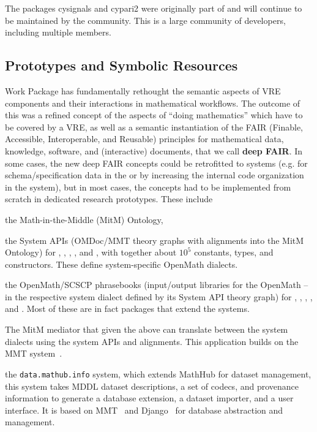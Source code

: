 \documentclass{deliverablereport}
\def\dmh{\texttt{data.mathub.info}\xspace}
\begin{document}
The packages cysignals and cypari2 were originally part of \Sage
and will continue to be maintained by the \Sage community.
This is a large community of developers, including multiple \ODK members.

  \subsection{Prototypes and Symbolic Resources}

Work Package  has fundamentally rethought the semantic aspects of VRE components and their interactions in mathematical workflows.
The outcome of this was a refined concept of the aspects of ``doing mathematics'' which have to be covered by a VRE, as well as a semantic instantiation of the FAIR (Finable, Accessible, Interoperable, and Reusable) principles for mathematical data, knowledge, software, and (interactive) documents, that we call \textbf{deep FAIR}.
In some cases, the new deep FAIR concepts could be retrofitted to \pn systems (e.g. for schema/specification data in the \LMFDB or by increasing the internal code organization in the \GAP system), but in most cases, the concepts had to be implemented from scratch in dedicated research prototypes. These include
\begin{compactenum}
\item the Math-in-the-Middle (MitM) Ontology,
\item the System APIs (OMDoc/MMT theory graphs with alignments into the MitM Ontology) for \GAP, \Sage, \LMFDB, \Singular, and \PariGP, with together about $10^5$ constants, types, and constructors. These define system-specific OpenMath dialects.
\item the OpenMath/SCSCP phrasebooks (input/output libraries for the OpenMath -- in the respective system dialect defined by its System API theory graph) for \GAP, \Sage, \LMFDB, \Singular, and \PariGP. Most of these are in fact packages that extend the systems.
  \item The MitM mediator that  given the above can translate between the system dialects using the system APIs and alignments. This application builds on the MMT system~\cite{uniformal:on}.
  \item the \dmh system, which extends MathHub for dataset management, this system takes MDDL dataset descriptions, a set of codecs, and provenance information to generate a database extension, a dataset importer, and a user interface.  It is based on MMT~\cite{uniformal:on} and Django~\cite{django:on} for database abstraction and management.
  \end{compactenum}
\end{document}
